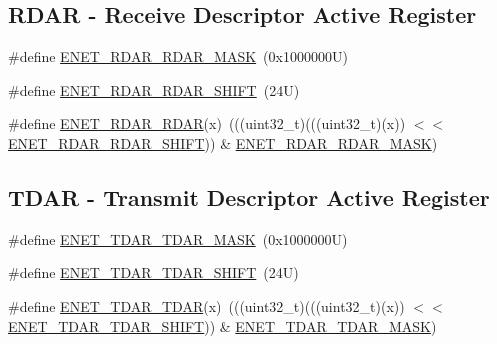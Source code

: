 \subsection*{R\+D\+AR -\/ Receive Descriptor Active Register}
\begin{DoxyCompactItemize}
\item 
\#define \mbox{\hyperlink{group___e_n_e_t___register___masks_gaf4ddad52a6258f0e5958ab67f26a5a00}{E\+N\+E\+T\+\_\+\+R\+D\+A\+R\+\_\+\+R\+D\+A\+R\+\_\+\+M\+A\+SK}}~(0x1000000\+U)
\item 
\#define \mbox{\hyperlink{group___e_n_e_t___register___masks_ga6f04308372016c60e2cb80485451e9d9}{E\+N\+E\+T\+\_\+\+R\+D\+A\+R\+\_\+\+R\+D\+A\+R\+\_\+\+S\+H\+I\+FT}}~(24\+U)
\item 
\#define \mbox{\hyperlink{group___e_n_e_t___register___masks_ga713c177989cf26983665bbe7591b3099}{E\+N\+E\+T\+\_\+\+R\+D\+A\+R\+\_\+\+R\+D\+AR}}(x)~(((uint32\+\_\+t)(((uint32\+\_\+t)(x)) $<$$<$ \mbox{\hyperlink{group___e_n_e_t___register___masks_ga6f04308372016c60e2cb80485451e9d9}{E\+N\+E\+T\+\_\+\+R\+D\+A\+R\+\_\+\+R\+D\+A\+R\+\_\+\+S\+H\+I\+FT}})) \& \mbox{\hyperlink{group___e_n_e_t___register___masks_gaf4ddad52a6258f0e5958ab67f26a5a00}{E\+N\+E\+T\+\_\+\+R\+D\+A\+R\+\_\+\+R\+D\+A\+R\+\_\+\+M\+A\+SK}})
\end{DoxyCompactItemize}
\subsection*{T\+D\+AR -\/ Transmit Descriptor Active Register}
\begin{DoxyCompactItemize}
\item 
\#define \mbox{\hyperlink{group___e_n_e_t___register___masks_ga5758f935dabab51a86c68161bce5be1b}{E\+N\+E\+T\+\_\+\+T\+D\+A\+R\+\_\+\+T\+D\+A\+R\+\_\+\+M\+A\+SK}}~(0x1000000\+U)
\item 
\#define \mbox{\hyperlink{group___e_n_e_t___register___masks_gae2d1ffef71e20daf95833ce26619b212}{E\+N\+E\+T\+\_\+\+T\+D\+A\+R\+\_\+\+T\+D\+A\+R\+\_\+\+S\+H\+I\+FT}}~(24\+U)
\item 
\#define \mbox{\hyperlink{group___e_n_e_t___register___masks_ga72ab90266aebcb50faf2159b0f4cf346}{E\+N\+E\+T\+\_\+\+T\+D\+A\+R\+\_\+\+T\+D\+AR}}(x)~(((uint32\+\_\+t)(((uint32\+\_\+t)(x)) $<$$<$ \mbox{\hyperlink{group___e_n_e_t___register___masks_gae2d1ffef71e20daf95833ce26619b212}{E\+N\+E\+T\+\_\+\+T\+D\+A\+R\+\_\+\+T\+D\+A\+R\+\_\+\+S\+H\+I\+FT}})) \& \mbox{\hyperlink{group___e_n_e_t___register___masks_ga5758f935dabab51a86c68161bce5be1b}{E\+N\+E\+T\+\_\+\+T\+D\+A\+R\+\_\+\+T\+D\+A\+R\+\_\+\+M\+A\+SK}})
\end{DoxyCompactItemize}
